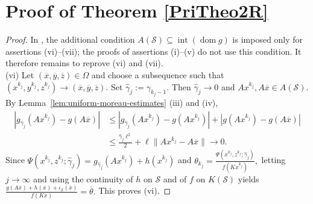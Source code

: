 \documentclass[11pt]{article}
\numberwithin{equation}{section}
\begin{document}
\section{Proof of Theorem \ref{PriTheo2R}}\label{appB}
\begin{proof}In \cite[Theorem~4.3]{BotLiTao2025}, the additional condition
$
    A(\mathcal S)\subseteq\operatorname{int}(\operatorname{dom}g)
$
is imposed only for assertions \textup{(vi)}--\textup{(vii)};
the proofs of assertions \textup{(i)}--\textup{(v)} do not use
this condition. It therefore remains  to reprove
\textup{(vi)} and \textup{(vii)}.\\
\textup{(vi)}
Let $(\overline x,\overline y,\overline z)\in\Omega$ and choose a subsequence such that
$
(x^{k_j},y^{k_j},z^{k_j})\longrightarrow(\overline x,\overline y,\overline z).
$
Set $\widehat\gamma_j:=\gamma_{k_j-1}$. Then $\widehat\gamma_j\to0$ and
$Ax^{k_j},A\overline x\in A(\mathcal S)$. By
Lemma~\ref{lem:uniform-moreau-estimates} (iii) and (iv),
\begin{align}
|g_{\widehat\gamma_j}(Ax^{k_j})-g(A\overline x)|
&\leq
|g_{\widehat\gamma_j}(Ax^{k_j})-g(Ax^{k_j})|
+|g(Ax^{k_j})-g(A\overline x)|\nonumber\\
&\leq\frac{\widehat\gamma_j\ell^2}{2}
+\ell\|Ax^{k_j}-A\overline x\|
\longrightarrow0.
\label{eq:moreau-value-convergence}
\end{align}
Since
$
\Psi(x^{k_j},z^{k_j};\widehat \gamma_j)
=g_{\widehat \gamma_j}(Ax^{k_j})+h(x^{k_j})
$
and
$
\theta_{k_j}
=\frac{\Psi(x^{k_j},z^{k_j};\widehat \gamma_j)}
{f(Kx^{k_j})},
$
letting $j\to\infty$ and using the continuity of $h$ on $\mathcal S$ and of $f$ on
$K(\mathcal S)$ yields
$
\frac{g(A\overline x)+h(\overline x)+\iota_{\mathcal S}(\overline x)}
{f(K\overline x)}=\overline\theta.
$
This proves \textup{(vi)}.


\end{proof}
\end{document}
